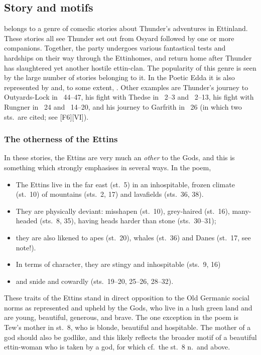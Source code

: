 \subsection{Story and motifs}

 belongs to a genre of comedic stories about Thunder’s adventures in Ettinland.  These stories all see Thunder set out from Osyard followed by one or more companions.  Together, the party undergoes various fantastical tests and hardships on their way through the Ettinhomes, and return home after Thunder has slaughtered yet another hostile ettin-clan.  The popularity of this genre is seen by the large number of stories belonging to it.  In the Poetic Edda it is also represented by  and, to some extent, .  Other examples are Thunder’s journey to Outyards-Lock in \Gylfaginning~44--47, his fight with Thedse in \Skaldskaparmal\ 2--3 and \Haustlong\ 2--13, his fight with Rungner in \Skaldskaparmal\ 24 and \Haustlong\ 14--20, and his journey to Garfrith in \Skaldskaparmal\ 26 (in which two sts.~are cited; see [F6][VI]).

\subsubsection{The otherness of the Ettins}

In these stories, the Ettins are very much an \emph{other} to the Gods, and this is something which  strongly emphasises in several ways.  In the poem,

\begin{itemize}
  \item The Ettins live in the far east (st.~5) in an inhospitable, frozen climate (st.~10) of mountains (sts.~2, 17) and lavafields (sts.~36, 38).
  \item They are physically deviant: misshapen (st.~10), grey-haired (st.~16), many-headed (sts.~8, 35), having heads harder than stone (sts.~30--31);
  \item they are also likened to apes (st.~20), whales (st.~36) and Danes (st.~17, see note!).
  \item In terms of character, they are stingy and inhospitable (sts.~9, 16)
  \item and snide and cowardly (sts.~19--20, 25--26, 28--32).
\end{itemize}

These traits of the Ettins stand in direct opposition to the Old Germanic social norms as represented and upheld by the Gods, who live in a lush green land and are young, beautiful, generous, and brave.  The one exception in the poem is Tew’s mother in st.~8, who is blonde, beautiful and hospitable.  The mother of a god should also be godlike, and this likely reflects the broader motif of a beautiful ettin-woman who is taken by a god, for which cf.~the st.~8 n.~and  above.

